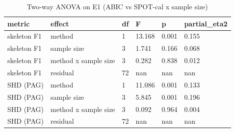 \begin{table}[t]
\centering\footnotesize
\caption{Two-way ANOVA on E1 (ABIC vs SPOT-cal x sample size)}\label{tab:T4_anova_E1}
\begin{tabular}{@{}llllll@{}}
\toprule
metric & effect & df & F & p & partial\_eta2\\
\midrule
skeleton F1 & method & 1 & 13.168 & 0.001 & 0.155\\
skeleton F1 & sample size & 3 & 1.741 & 0.166 & 0.068\\
skeleton F1 & method x sample size & 3 & 0.282 & 0.838 & 0.012\\
skeleton F1 & residual & 72 & nan & nan & nan\\
SHD (PAG) & method & 1 & 11.086 & 0.001 & 0.133\\
SHD (PAG) & sample size & 3 & 5.845 & 0.001 & 0.196\\
SHD (PAG) & method x sample size & 3 & 0.092 & 0.964 & 0.004\\
SHD (PAG) & residual & 72 & nan & nan & nan\\
\bottomrule
\end{tabular}
\end{table}
